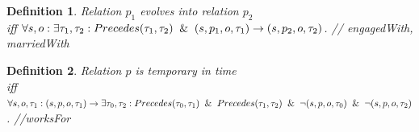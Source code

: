 \documentclass[letterpaper]{article} %
\newtheorem{definition}{Definition}
\begin{document}
\begin{definition}
Relation $p_1$ evolves into relation  $p_2$
\\ iff $ \forall s,o: \exists  \tau_1, \tau_2: Precedes(\tau_1, \tau_2) \And (s,p_1, o, \tau_1) \rightarrow (s,p_2, o, \tau_2)$. \hfill // engagedWith, marriedWith
\label{evolvepattern}
\end{definition}


\begin{definition}\label{temprelationt1t2}
Relation $p$ is temporary in time \\ iff
 $ \forall s,o, \tau_1: (s,p, o, \tau_1) \rightarrow \exists \tau_0, \tau_2: Precedes(\tau_0, \tau_1) \And Precedes(\tau_1, \tau_2)   \And \neg (s,p, o, \tau_0)  \And \neg (s,p, o, \tau_2)$. \hfill //worksFor
\end{definition}



\end{document}
